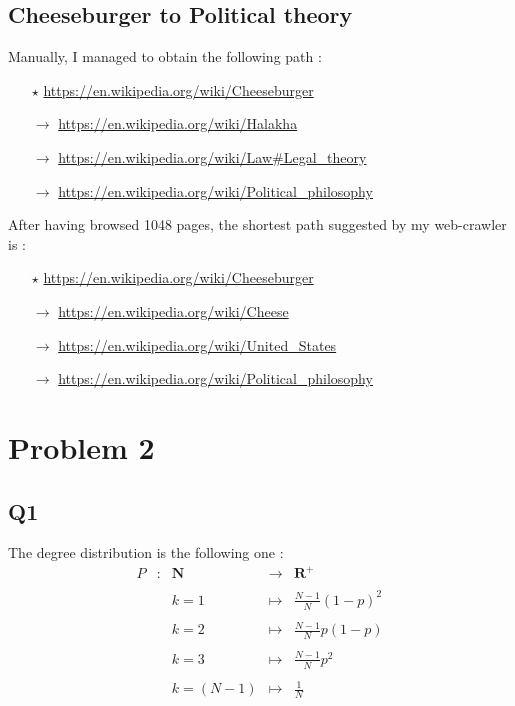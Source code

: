 \documentclass[a4paper]{report}
\begin{document}
\subsection*{Cheeseburger to Political theory}
Manually, I managed to obtain the following path :
\medbreak
\begin{itemize}
\item[$\star$] \url{https://en.wikipedia.org/wiki/Cheeseburger}
\item[$\rightarrow$] \url{https://en.wikipedia.org/wiki/Halakha}
\item[$\rightarrow$] \url{https://en.wikipedia.org/wiki/Law\#Legal_theory}
\item[$\rightarrow$] \url{https://en.wikipedia.org/wiki/Political_philosophy}
\end{itemize}
\medbreak

After having browsed 1048 pages, the shortest path suggested by my web-crawler is :
\medbreak
\begin{itemize}
\item[$\star$] \url{https://en.wikipedia.org/wiki/Cheeseburger}
\item[$\rightarrow$] \url{https://en.wikipedia.org/wiki/Cheese}
\item[$\rightarrow$] \url{https://en.wikipedia.org/wiki/United_States}
\item[$\rightarrow$] \url{https://en.wikipedia.org/wiki/Political_philosophy}
\end{itemize}
\medbreak

\section*{Problem 2}
\subsection*{Q1}
The degree distribution is the following one :
\[\begin{array}{ccccc}
P & : & \mathbf{N} & \to & \mathbf{R}^{+} \\
&&&&\\
 & & k=1 & \mapsto & \frac{N-1}{N}(1-p)^2 \\
&&&&\\
 & & k=2 & \mapsto & \frac{N-1}{N}p(1-p) \\
&&&&\\
 & & k=3 & \mapsto & \frac{N-1}{N}p^2 \\
&&&&\\
 & & k=(N-1) & \mapsto & \frac{1}{N} \\
\end{array}\]
\end{document}
